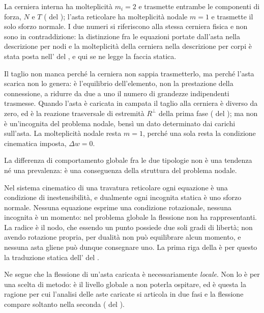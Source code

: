 \begin{oss}[Perché l'asta reticolare ha $m = 1$ e non
		$m = 2$]\label{oss:m_asta_vs_cerniera}
		La cerniera interna ha molteplicità $m_i = 2$ e trasmette
		entrambe le componenti di forza, $N$ e $T$
		( del
		); l'asta reticolare ha
		molteplicità nodale $m = 1$ e trasmette il solo sforzo
		normale. I due numeri si riferiscono alla stessa cerniera
		fisica e non sono in contraddizione: la distinzione fra
		le equazioni portate dall'asta nella descrizione per nodi
		e la molteplicità della cerniera nella descrizione per
		corpi è stata posta nell'
		del , e qui se ne legge la
		faccia statica.
		
		Il taglio non manca perché la cerniera non sappia
		trasmetterlo, ma perché l'asta scarica non lo genera: è
		l'equilibrio dell'elemento, non la prestazione della
		connessione, a ridurre da due a uno il numero di
		grandezze indipendenti trasmesse. Quando l'asta è
		caricata in campata il taglio alla cerniera è diverso da
		zero, ed è la reazione trasversale di estremità
		$R^\perp$ della prima fase
		( del
		); ma non è un'incognita del
		problema nodale, bensì un dato determinato dai carichi
		sull'asta. La molteplicità nodale resta $m = 1$, perché
		una sola resta la condizione cinematica imposta,
		$\Delta w = 0$.
\end{oss}


    La differenza di comportamento globale fra le due
	tipologie non è una tendenza né una prevalenza: è una
	conseguenza della struttura del problema nodale.
	
	Nel sistema cinematico di una travatura reticolare ogni
	equazione è una condizione di inestensibilità, e dualmente
	ogni incognita statica è uno sforzo normale. Nessuna
	equazione esprime una condizione rotazionale, nessuna
	incognita è un momento: nel problema globale la flessione
	non ha rappresentanti. La radice è il nodo, che essendo un
	punto possiede due soli gradi di libertà; non avendo
	rotazione propria, per dualità non può equilibrare alcun
	momento, e nessuna asta gliene può dunque consegnare uno.
	La prima riga della  è per questo
	la traduzione statica dell' del
	.
	
	Ne segue che la flessione di un'asta caricata è
	necessariamente \emph{locale}. Non lo è per una scelta di
	metodo: è il livello globale a non poterla ospitare, ed è
	questa la ragione per cui l'analisi delle aste caricate si
	articola in due fasi e la flessione compare soltanto nella
	seconda ( del
	).
	
